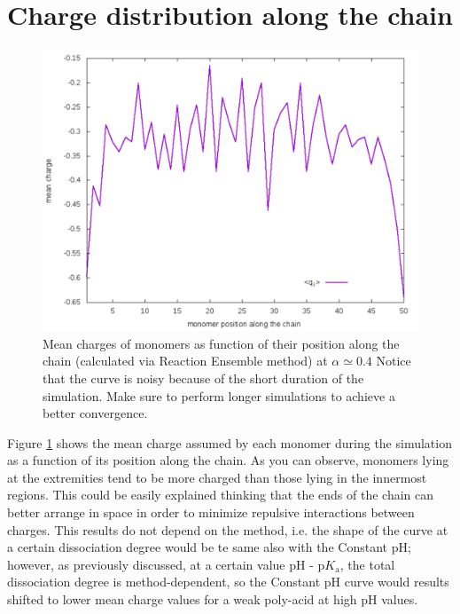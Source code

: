 \documentclass[
a4paper,                        %
11pt,                           %
twoside,                        %
footsepline,                    %
headsepline,                    %
headexclude,                    %
footexclude,                    %
pagesize,                       %
]{scrartcl}
\begin{document}
\section{Charge distribution along the chain}

\begin{figure}[h]
	\centering
	\includegraphics[scale=0.6]{figures/qdistrib.pdf}
	\caption{Mean charges of monomers as function of their position along the chain (calculated via Reaction Ensemble method) at $\alpha \simeq 0.4$ Notice that the curve is noisy because of the short duration of the simulation. Make sure to perform longer simulations to achieve a better convergence.}
	\label{qdistrib}
\end{figure}
Figure \ref{qdistrib} shows the mean charge assumed by each monomer during the simulation as a function of its position along the chain. As you can observe, monomers lying at the extremities tend to be more charged than those lying in the innermost regions. This could be easily explained thinking that the ends of the chain can better arrange in space in order to minimize repulsive interactions between charges. This results do not depend on the method, i.e. the shape of the curve at a certain dissociation degree would be te same also with the Constant pH; however, as previously discussed, at a certain value $\text{pH - p}K_\text{a}$, the total dissociation degree is method-dependent, so the Constant pH curve would results shifted to lower mean charge values for a weak poly-acid at high pH values.



\end{document}
